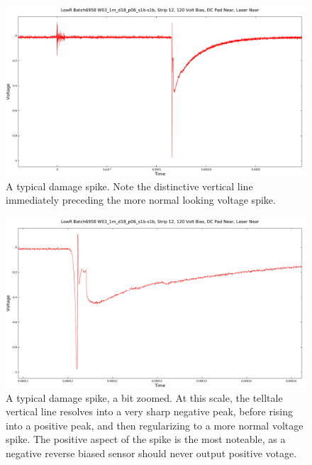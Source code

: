 \documentclass{report}
\begin{document}
            \begin{figure}[h] 
                \includegraphics[height=.4\textheight]{damage_spike}
                \centering
                \caption{ A typical damage spike. Note the distinctive vertical line immediately preceding the more normal looking voltage spike. }
                \label{fig:damage_spike}
            \end{figure}

            \begin{figure}[h] 
                \includegraphics[height=.4\textheight]{damage_spike_zoom}
                \centering
                \caption{ A typical damage spike, a bit zoomed. At this scale, the telltale vertical line resolves into a very sharp negative peak, before rising into a positive peak, and then regularizing to a more normal voltage spike. The positive aspect of the spike is the most noteable, as a negative reverse biased sensor should never output positive votage. }
                \label{fig:damage_spike_zoom}
            \end{figure}
            
\end{document}
